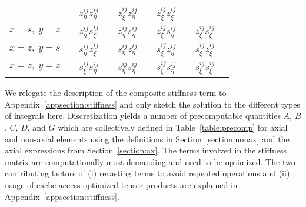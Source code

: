 \begin{table*}
\begin{minipage}{156mm}
\begin{center}
\begin{tabular}{@{}llllll}
&$\hspace{1em} z_\eta^{ij} z_\eta^{ij}$ &$\hspace{1em} z_\xi^{ij}
z_\eta^{ij}$ &$\hspace{1em} z_\xi^{ij} z_\xi^{ij}$ \\[5pt]
$x=s,\; y=z$ &$\hspace{1em} z_\eta^{ij} s_\xi^{ij} $
&$\hspace{1em} z_\eta^{ij} s_\eta^{ij}$ &$\hspace{1em} z_\xi^{ij}
s_\eta^{ij}$ &$\hspace{1em} z_\xi^{ij} s_\xi^{ij}$ \\[5pt]
$x=z,\; y=s$ &$\hspace{1em} s_\eta^{ij} z_\xi^{ij}$
&$\hspace{1em} s_\eta^{ij} z_\eta^{ij}$ &$\hspace{1em} s_\xi^{ij}
z_\eta^{ij}$ &$\hspace{1em} s_\xi^{ij} z_\xi^{ij}$ \\[5pt]
$x=z,\; y=z$ &$\hspace{1em} s_\xi^{ij} s_\eta^{ij}$ &$\hspace{1em}
s_\eta^{ij} s_\eta^{ij} $&$\hspace{1em} s_\xi^{ij}
s_\eta^{ij}$ &$\hspace{1em} s_\xi^{ij} s_\xi^{ij}$ \\[5pt]
\hline
\end{tabular}
\end{center}
\end{minipage}
\end{table*}
%
We relegate the description of the composite stiffness term to
Appendix~\ref{appsection:stiffness} and only sketch the solution to the
different types of integrals here.
Discretization yields a number of precomputable quantities
$A$, $B$, $C$, $D$, and $G$ which are collectively defined
in Table~\ref{table:precomp} for axial and non-axial elements using the
definitions in Section~\ref{section:nonax} and the axial expressions from
Section~\ref{section:ax}.
The terms involved in the stiffness matrix are computationally
most demanding and need to be optimized. The two contributing factors of (i)
recasting terms to avoid repeated operations and
(ii) usage of cache-access optimized tensor products are
explained in Appendix~\ref{appsection:stiffness}.

